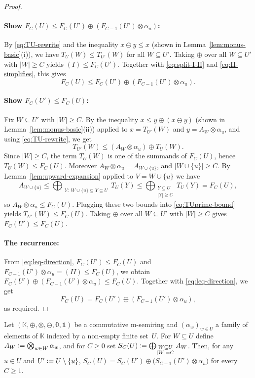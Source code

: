 \begin{toappendix}
\begin{proof}
\paragraph*{Show $F_C(U)\le F_C(U')\oplus(F_{C-1}(U')\otimes\alpha_u)$: }
  By \eqref{eq:TU-rewrite} and the inequality $x\ominus y\le x$ (shown in Lemma~\ref{lem:monus-basic}(i)),
we have $T_U(W)\le T_{U'}(W)$ for all $W\subseteq U'$.
Taking $\oplus$ over all $W\subseteq U'$ with $|W|\ge C$ yields $(I)\le F_C(U')$.
Together with \eqref{eq:split-I-II} and \eqref{eq:II-simplifies}, this gives
\begin{equation}\label{eq:leq-direction}
F_C(U)\le F_C(U')\oplus(F_{C-1}(U')\otimes\alpha_u).
\end{equation}

\paragraph*{Show $F_C(U')\le F_C(U)$: }
Fix $W\subseteq U'$ with $|W|\ge C$.
By the inequality $x\le y\oplus(x\ominus y)$ (shown in Lemma~\ref{lem:monus-basic}(ii)) applied to
$x=T_{U'}(W)$ and $y=A_W\otimes\alpha_u$, and using \eqref{eq:TU-rewrite}, we get
\begin{equation}\label{eq:TUprime-bound}
T_{U'}(W)\le (A_W\otimes\alpha_u)\oplus T_U(W).
\end{equation}
Since $|W|\ge C$, the term $T_U(W)$ is one of the summands of $F_C(U)$, hence $T_U(W)\le F_C(U)$.
Moreover $A_W\otimes\alpha_u=A_{W\cup\{u\}}$, and $|W\cup\{u\}|\ge C$.
By Lemma~\ref{lem:upward-expansion} applied to $V=W\cup\{u\}$ we have
\[
A_{W\cup\{u\}}
\le
\bigoplus_{\substack{Y:\;W\cup\{u\}\subseteq Y\subseteq U}} T_U(Y)
\le
\bigoplus_{\substack{Y\subseteq U\\|Y|\ge C}}T_U(Y)
=
F_C(U),
\]
so $A_W\otimes\alpha_u\le F_C(U)$.
Plugging these two bounds into \eqref{eq:TUprime-bound} yields $T_{U'}(W)\le F_C(U)$.
Taking $\oplus$ over all $W\subseteq U'$ with $|W|\ge C$ gives $F_C(U')\le F_C(U)$.

\paragraph*{The recurrence: }
From \eqref{eq:leq-direction}, $F_C(U')\le F_C(U)$ and
$F_{C-1}(U')\otimes\alpha_u=(II)\le F_C(U)$, we obtain
$F_C(U')\oplus(F_{C-1}(U')\otimes\alpha_u)\le F_C(U)$.
Together with \eqref{eq:leq-direction}, we get
\[
F_C(U)=F_C(U')\oplus(F_{C-1}(U')\otimes\alpha_u),
\]
as required.
\end{proof}
\begin{lemma}\label{lem:SC_recurrence}
Let $(\mathbb K,\oplus,\otimes,\ominus,\mathbb 0,\mathbb 1)$ be a
commutative m-semiring and $(\alpha_w)_{w\in U}$ a family of elements of
$\mathbb K$ indexed by a non-empty finite set~$U$. For
$W\subseteq U$ define~$A_W\mathrel{\mathop:}=\nobreak\bigotimes_{w\in W}\alpha_w$, and for
$C\ge 0$ set $S_C(U)\mathrel{\mathop:}=\bigoplus_{\substack{W\subseteq U\\|W|=C}} A_W$.
Then, for any $u\in U$ and $U'\mathrel{\mathop:}= U\setminus\{u\}$,
$S_C(U)=S_C(U')\oplus\bigl(S_{C-1}(U')\otimes\alpha_u\bigr)$ for every $C\ge 1$.
\end{lemma}


\end{toappendix}
